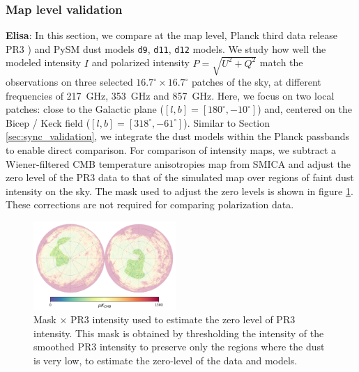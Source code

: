 \documentclass[twocolumn]{aastex631}
\newcommand{\dnine}{{\tt d9}}
\begin{document}
\subsubsection{Map level validation}
\textbf{Elisa}: In this section, we compare at the map level, Planck third data release PR3 \cite{planck2016-l03}) and PySM dust models \dnine{}, {\tt d11}, {\tt d12} models. We study how well the modeled intensity $I$ and polarized intensity $P = \sqrt{U^2 + Q^2}$ match the observations on three selected $16.7^\circ \times 16.7^\circ$ patches of the sky, at different frequencies of 217~GHz, 353~GHz and 857~GHz. Here, we focus on two local patches: close to the Galactic plane ($[l,b] =[180^\circ,-10^\circ]$) and, centered on the Bicep / Keck field ($[l,b] =[318^\circ,-61^\circ]$).
Similar to Section \ref{sec:sync_validation}, we integrate the dust models within the Planck passbands to enable direct comparison. For comparison of intensity maps, we subtract a Wiener-filtered CMB temperature anisotropies map from SMICA and adjust the zero level of the PR3 data to that of the simulated map over regions of faint dust intensity on the sky.
The mask used to adjust the zero levels is shown in figure \ref{fig:mask_zero_lvl_int}. These corrections are not required for comparing polarization data.
\begin{figure}[ht!]
    \centering
    \includegraphics[width=0.48\textwidth]{figures/mask_intxPR3_zero_lvl.png}
    \caption{Mask $\times$ PR3 intensity used to estimate the zero level of PR3 intensity. This mask is obtained by thresholding the intensity of the smoothed PR3 intensity to preserve only the regions where the dust is very low, to estimate the zero-level of the data and models.}%
    \label{fig:mask_zero_lvl_int}
\end{figure}
\end{document}
